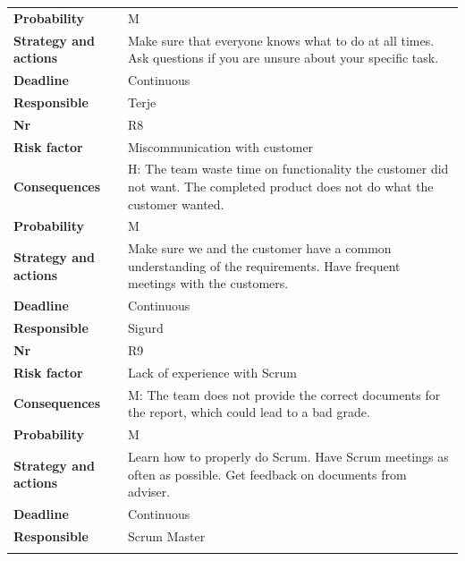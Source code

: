 \begin{longtable}{l p{9cm}}
\textbf{Probability} & M \\ 
\textbf{Strategy and actions} & Make sure that everyone knows what to do at all times. Ask questions if you are unsure about your specific task. \\
\textbf{Deadline} & Continuous \\
\textbf{Responsible} & Terje \\
\hline
\textbf{Nr} & R8 \\
\textbf{Risk factor} & Miscommunication with customer \\
\textbf{Consequences} & H: The team waste time on functionality the customer did not want. The completed product does not do what the customer wanted. \\
\textbf{Probability} & M \\ 
\textbf{Strategy and actions} & Make sure we and the customer have a common understanding of the requirements.
Have frequent meetings with the customers.  \\
\textbf{Deadline} & Continuous \\
\textbf{Responsible} & Sigurd \\
\hline
\textbf{Nr} & R9 \\
\textbf{Risk factor} & Lack of experience with Scrum \\
\textbf{Consequences} & M: The team does not provide the correct documents for the report, which could lead to a bad grade. \\
\textbf{Probability} & M \\ 
\textbf{Strategy and actions} & Learn how to properly do Scrum. Have Scrum meetings as often as possible. Get feedback on documents from adviser. \\
\textbf{Deadline} & Continuous \\
\textbf{Responsible} & Scrum Master \\
\hline
\label{tab:risk}
\end{longtable}

